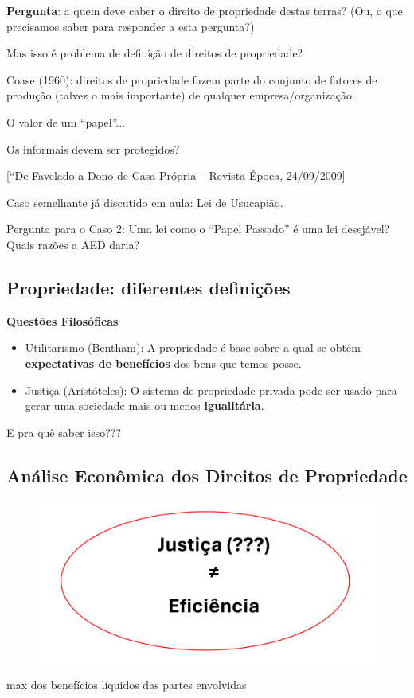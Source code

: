 \documentclass[a4paper,12pt]{article}[abntex2]
\begin{document}
\textbf{Pergunta}: a quem deve caber o direito de propriedade destas terras? (Ou, o que precisamos saber para responder a esta pergunta?)

Mas isso é problema de definição de direitos de propriedade?

Coase (1960): direitos de propriedade fazem parte do conjunto de fatores de produção (talvez o mais importante) de qualquer empresa/organização. 

O valor de um “papel”...

Os informais devem ser protegidos? 

[“De Favelado a Dono de Casa Própria – Revista Época, 24/09/2009]

Caso semelhante já discutido em aula: Lei de Usucapião.

Pergunta para o Caso 2: Uma lei como o “Papel Passado” é uma lei desejável? Quais razões a AED daria?

\subsection{\textbf{Propriedade: diferentes definições }}
\textbf{Questões Filosóficas}\begin{itemize}
    \item Utilitarismo (Bentham): A propriedade é base sobre a qual se obtém \textbf{expectativas de benefícios} dos bens que temos posse. 
    \item Justiça (Aristóteles): O sistema de propriedade privada pode ser usado para gerar uma sociedade mais ou menos \textbf{igualitária}.
\end{itemize}

E pra quê saber isso???

\subsection{\textbf{Análise Econômica dos Direitos de Propriedade}}
\begin{figure}[H]
    \centering
    \includegraphics[width=0.5\linewidth]{Imagens/a4i6.png}
\end{figure}

max dos benefícios líquidos das partes envolvidas
\end{document}
